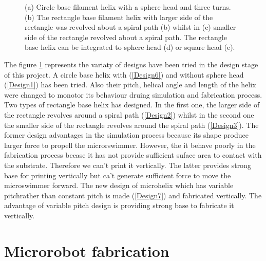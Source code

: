 \documentclass[12pt,a4paper,titlepage]{report}
\begin{document}
\begin{figure}
        \caption[Different helical designs]{(a) Circle base filament helix with a sphere
head and three turns. (b) The rectangle base filament helix with larger side of the rectangle
was revolved about a spiral path (b) whilst in (c) smaller side of the rectangle revolved 
about a spiral path. The rectangle base helix can be integrated to sphere head (d) or square
head (e).}\label{Different helical designs}

       

\end{figure}

The figure \ref{Different helical designs} represents the
variaty of designs have been tried in the design stage of this project. A circle base helix with (\ref{Design6}) 
and without sphere head (\ref{Design1}) has been tried. Also their pitch, helical angle and length of the helix
were changed to monotor its behaviour druing simulation and fabrication process. Two types of
 rectangle base helix has designed. In the first one, the larger side of the rectangle revolves around a spiral path (\ref{Design2})
whilst in the second one the smaller side of the rectangle revolves around the spiral path (\ref{Design3}).
The former design advantages in the simulation process because its shape produce larger force to propell the microrswimmer.
However, the it behave poorly in the fabrication process becase it has not provide sufficient suface area to contact with the 
substrate. Therefore we can\rq{}t print it vertically. The latter provides strong base for printing vertically but ca\rq{}t generate 
sufficient force to move the microswimmer forward. The new design of microhelix which has
variable pitchrather than constant pitch is made (\ref{Design7}) and fabricated vertically. The advantage of variable pitch design 
is providing strong base to fabricate it vertically. 





\section{Microrobot fabrication} \label{microFabric}
\end{document}
